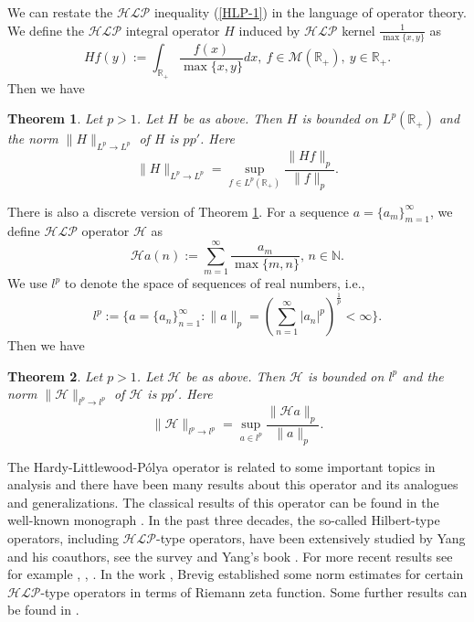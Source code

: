 \documentclass[10pt]{amsart}
\newtheorem{theorem}{Theorem}[section]
\theoremstyle{definition}    %
\numberwithin{equation}{section}
\begin{document}
We can restate the ${\mathcal{HLP}}$ inequality (\ref{HLP-1}) in the language of operator theory. We define the ${\mathcal{HLP}}$ integral operator $H$ induced by ${\mathcal{HLP}}$ kernel $\frac{1}{\max\{x,y\}}$ as 
\begin{equation*}Hf(y):=\int_{\mathbb{R}_{+}} \frac{f(x)}{\max\{x,y\}}dx,\: f \in \mathcal{M}(\mathbb{R}_{+}),\: y\in \mathbb{R}_{+}.
\end{equation*}
Then we have
\begin{theorem}\label{fir}Let $p>1$. Let $H$ be as above. Then $H$ is bounded on $L^p(\mathbb{R}_+)$ and the norm $\|H\|_{L^p\rightarrow L^p}$ of $H$ is $pp'$. Here
\begin{equation*}
\|H\|_{L^p\rightarrow L^p}=\sup_{f\in L^p(\mathbb{R}_{+})}
\frac{\|Hf\|_{p}}{\|f\|_{p}}.
\end{equation*}
\end{theorem}
There is also a discrete version of Theorem \ref{fir}.  For a sequence $a=\{a_m\}_{m=1}^{\infty}$, we define ${\mathcal{HLP}}$ operator $\mathcal{H}$ as
$${\mathcal{H}}a(n):=\sum_{m=1}^{\infty}\frac{a_m}{\max\{m,n\}}, \,n\in \mathbb{N}.$$
We use $l^p$ to denote the space of sequences of real numbers, i.e.,
\begin{equation*}l^{p}:=\{a=\{a_n\}_{n=1}^{\infty}: \|a\|_{p}= (\sum_{n=1}^{\infty} |a_{n}|^p )^{\frac{1}{p}}<\infty \}.\end{equation*}
Then we have
\begin{theorem}Let $p>1$. Let $\mathcal{H}$ be as above. Then $\mathcal{H}$ is bounded on $l^p$ and the norm $\|\mathcal{H}\|_{l^p \rightarrow l^p}$ of $\mathcal{H}$ is $pp'$. Here
\begin{equation*}
\|\mathcal{H}\|_{l^p \rightarrow l^p}=\sup_{a\in l^p}
\frac{\|\mathcal{H}a\|_{p}}{\|a\|_{p}}.
\end{equation*}
\end{theorem}

The Hardy-Littlewood-P\'olya operator is related to some important topics in analysis and there have been many results about this operator and its analogues and generalizations. The classical results of this operator can be found in the well-known monograph \cite{HLP}.  In the past three decades,  the so-called Hilbert-type operators, including ${\mathcal{HLP}}$-type operators, have been extensively studied by Yang and his coauthors,  see the survey \cite{YR} and Yang's book \cite{Y3}. For more recent results see for example \cite{Jin}, \cite{WHY}, \cite{YZ}. In the work \cite{B}, Brevig established some norm estimates for certain ${\mathcal{HLP}}$-type operators in terms of Riemann zeta function.  Some further results can be found in \cite{B-1}. 
\end{document}
